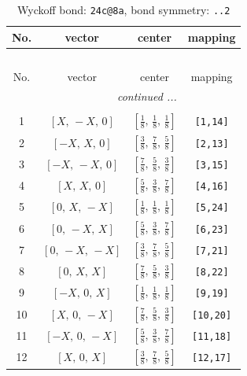 \documentclass[fleqn,8pt]{jsarticle}
\begin{document}
\renewcommand{\arraystretch}{1.2}
\begin{longtable}{cccc}
\caption{Wyckoff bond: {\tt 24c@8a}, bond symmetry: {\tt ..2}}
 \\
 \hline \hline
No. & vector & center & mapping \\ \hline \endfirsthead

\multicolumn{3}{l}{\tablename\ \thetable{}} \\
 \hline \hline
No. & vector & center & mapping \\ \hline \endhead

 \hline \hline
\multicolumn{3}{r}{\footnotesize\it continued ...} \\ \endfoot

 \hline \hline
\multicolumn{3}{r}{} \\ \endlastfoot

1 & $\left[ X,\, - X,\, 0 \right]$ & $\left[ \frac{1}{8},\, \frac{1}{8},\, \frac{1}{8} \right]$ & {\tt [1,14]} \\ \hline
2 & $\left[ - X,\, X,\, 0 \right]$ & $\left[ \frac{3}{8},\, \frac{7}{8},\, \frac{5}{8} \right]$ & {\tt [2,13]} \\ \hline
3 & $\left[ - X,\, - X,\, 0 \right]$ & $\left[ \frac{7}{8},\, \frac{5}{8},\, \frac{3}{8} \right]$ & {\tt [3,15]} \\ \hline
4 & $\left[ X,\, X,\, 0 \right]$ & $\left[ \frac{5}{8},\, \frac{3}{8},\, \frac{7}{8} \right]$ & {\tt [4,16]} \\ \hline
5 & $\left[ 0,\, X,\, - X \right]$ & $\left[ \frac{1}{8},\, \frac{1}{8},\, \frac{1}{8} \right]$ & {\tt [5,24]} \\ \hline
6 & $\left[ 0,\, - X,\, X \right]$ & $\left[ \frac{5}{8},\, \frac{3}{8},\, \frac{7}{8} \right]$ & {\tt [6,23]} \\ \hline
7 & $\left[ 0,\, - X,\, - X \right]$ & $\left[ \frac{3}{8},\, \frac{7}{8},\, \frac{5}{8} \right]$ & {\tt [7,21]} \\ \hline
8 & $\left[ 0,\, X,\, X \right]$ & $\left[ \frac{7}{8},\, \frac{5}{8},\, \frac{3}{8} \right]$ & {\tt [8,22]} \\ \hline
9 & $\left[ - X,\, 0,\, X \right]$ & $\left[ \frac{1}{8},\, \frac{1}{8},\, \frac{1}{8} \right]$ & {\tt [9,19]} \\ \hline
10 & $\left[ X,\, 0,\, - X \right]$ & $\left[ \frac{7}{8},\, \frac{5}{8},\, \frac{3}{8} \right]$ & {\tt [10,20]} \\ \hline
11 & $\left[ - X,\, 0,\, - X \right]$ & $\left[ \frac{5}{8},\, \frac{3}{8},\, \frac{7}{8} \right]$ & {\tt [11,18]} \\ \hline
12 & $\left[ X,\, 0,\, X \right]$ & $\left[ \frac{3}{8},\, \frac{7}{8},\, \frac{5}{8} \right]$ & {\tt [12,17]} \\
\end{longtable}
\end{document}
